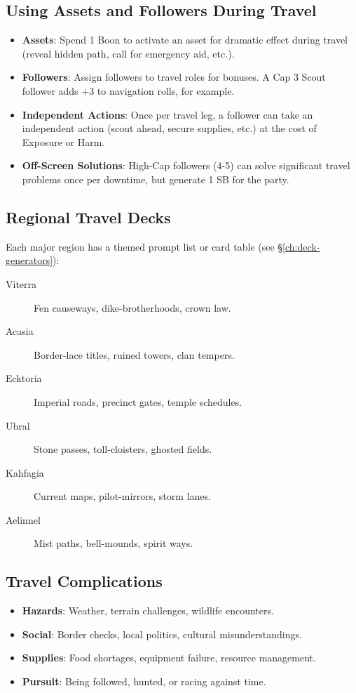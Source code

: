 \subsection*{Using Assets and Followers During Travel}
\begin{itemize}
\item \textbf{Assets}: Spend 1 Boon to activate an asset for dramatic effect during travel (reveal hidden path, call for emergency aid, etc.).
\item \textbf{Followers}: Assign followers to travel roles for bonuses. A Cap 3 Scout follower adds +3 to navigation rolls, for example.
\item \textbf{Independent Actions}: Once per travel leg, a follower can take an independent action (scout ahead, secure supplies, etc.) at the cost of Exposure or Harm.
\item \textbf{Off-Screen Solutions}: High-Cap followers (4-5) can solve significant travel problems once per downtime, but generate 1 SB for the party.
\end{itemize}

\subsection*{Regional Travel Decks}
Each major region has a themed prompt list or card table (see \S\ref{ch:deck-generators}):
\begin{description}
\item[Viterra]  Fen causeways, dike-brotherhoods, crown law.
\item[Acasia]  Border-lace titles, ruined towers, clan tempers.
\item[Ecktoria]  Imperial roads, precinct gates, temple schedules.
\item[Ubral]  Stone passes, toll-cloisters, ghosted fields.
\item[Kahfagia]  Current maps, pilot-mirrors, storm lanes.
\item[Aelinnel]  Mist paths, bell-mounds, spirit ways.
\end{description}

\subsection*{Travel Complications}
\begin{itemize}
\item \textbf{Hazards}: Weather, terrain challenges, wildlife encounters.
\item \textbf{Social}: Border checks, local politics, cultural misunderstandings.
\item \textbf{Supplies}: Food shortages, equipment failure, resource management.
\item \textbf{Pursuit}: Being followed, hunted, or racing against time.
\end{itemize}

